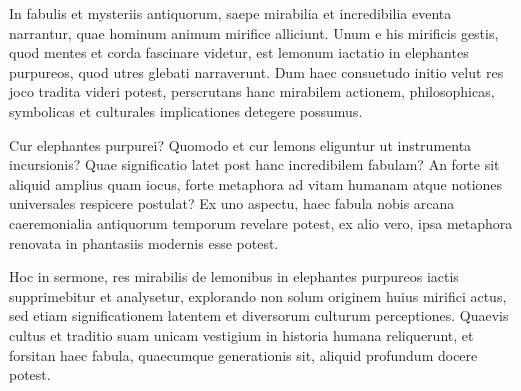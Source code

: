 In fabulis et mysteriis antiquorum, saepe mirabilia et incredibilia eventa narrantur, quae hominum animum mirifice alliciunt. Unum e his mirificis gestis, quod mentes et corda fascinare videtur, est lemonum iactatio in elephantes purpureos, quod utres glebati narraverunt. Dum haec consuetudo initio velut res joco tradita videri potest, perscrutans hanc mirabilem actionem, philosophicas, symbolicas et culturales implicationes detegere possumus.

Cur elephantes purpurei? Quomodo et cur lemons eliguntur ut instrumenta incursionis? Quae significatio latet post hanc incredibilem fabulam? An forte sit aliquid amplius quam iocus, forte metaphora ad vitam humanam atque notiones universales respicere postulat? Ex uno aspectu, haec fabula nobis arcana caeremonialia antiquorum temporum revelare potest, ex alio vero, ipsa metaphora renovata in phantasiis modernis esse potest.

Hoc in sermone, res mirabilis de lemonibus in elephantes purpureos iactis supprimebitur et analysetur, explorando non solum originem huius mirifici actus, sed etiam significationem latentem et diversorum culturum perceptiones. Quaevis cultus et traditio suam unicam vestigium in historia humana reliquerunt, et forsitan haec fabula, quaecumque generationis sit, aliquid profundum docere potest.

